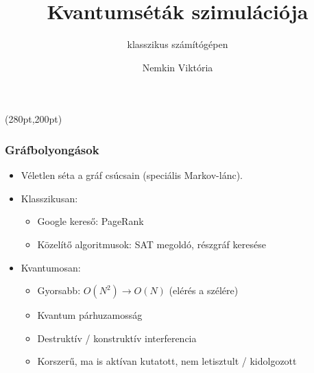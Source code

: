 \documentclass[aspectratio=169]{beamer}
\author[Nemkin Viktória]{Nemkin Viktória}
\institute[]{
\begin{small}dr. Friedl Katalin\end{small}\\
\begin{footnotesize}Számítástudományi és Információelméleti Tanszék\end{footnotesize}
}
\title{Kvantumséták szimulációja}
\subtitle{klasszikus számítógépen}
\date{}
\begin{document}
\begin{frame}
\titlepage

\begin{textblock*}{150pt}(280pt,200pt) %

\end{textblock*}
\end{frame}

\begin{frame}
  \frametitle{Gráfbolyongások}
  
  \begin{itemize}
    \item Véletlen séta a gráf csúcsain (speciális Markov-lánc).
    \item Klasszikusan:
    \begin{itemize}
        \item Google kereső: PageRank
        \item Közelítő algoritmusok: SAT megoldó, részgráf keresése
    \end{itemize}
    \item Kvantumosan:
    \begin{itemize}
        \item Gyorsabb: $O(N^2) \rightarrow O(N)$ (elérés a szélére)
        \item Kvantum párhuzamosság
        \item Destruktív / konstruktív interferencia
        \item Korszerű, ma is aktívan kutatott, nem letisztult / kidolgozott
    \end{itemize}
  \end{itemize}
\end{frame}
\end{document}
